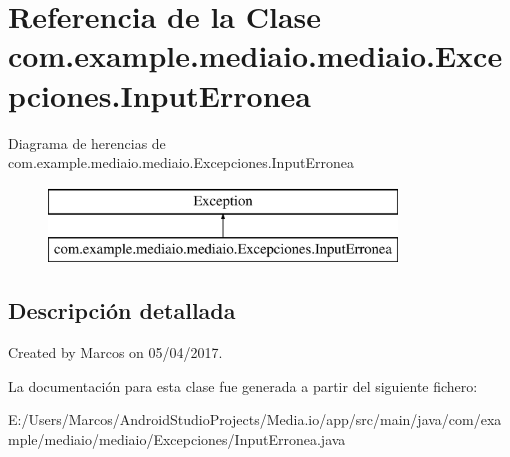 \hypertarget{classcom_1_1example_1_1mediaio_1_1mediaio_1_1_excepciones_1_1_input_erronea}{}\section{Referencia de la Clase com.\+example.\+mediaio.\+mediaio.\+Excepciones.\+Input\+Erronea}
\label{classcom_1_1example_1_1mediaio_1_1mediaio_1_1_excepciones_1_1_input_erronea}
Diagrama de herencias de com.\+example.\+mediaio.\+mediaio.\+Excepciones.\+Input\+Erronea\begin{figure}[H]
\begin{center}
\leavevmode
\includegraphics[height=2.000000cm]{classcom_1_1example_1_1mediaio_1_1mediaio_1_1_excepciones_1_1_input_erronea}
\end{center}
\end{figure}


\subsection{Descripción detallada}
Created by Marcos on 05/04/2017. 

La documentación para esta clase fue generada a partir del siguiente fichero\+:\begin{DoxyCompactItemize}
\item 
E\+:/\+Users/\+Marcos/\+Android\+Studio\+Projects/\+Media.\+io/app/src/main/java/com/example/mediaio/mediaio/\+Excepciones/Input\+Erronea.\+java\end{DoxyCompactItemize}
